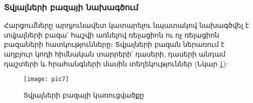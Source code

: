 {
    \subsubsection{Տվյալների բազայի նախագծում}\label{subsubsec:database}

    Հարցումները արդյունավետ կատարելու նպատակով նախագծվել է տվյալների բազա՝ հաշվի առնելով ռելացիոն ու ոչ ռելացիոն
    բազաների հատկությունները։ Տվյալների բազան ներառում է աղբյուր կոդի հիմնական տարրերի՝ դասերի, դասերի անդամ դաշտերի
    և հրահանգների մասին տեղեկություններ (Նկար \ref{fig:figure7}):

    \begin{figure}[h]
        \centering
        \texttt{[image: pic7]}
        \caption{Տվյալների բազայի կառուցվածքը}
        \label{fig:figure7}
    \end{figure}
}